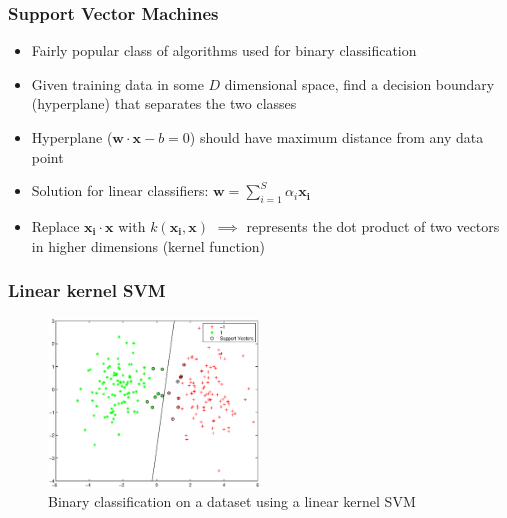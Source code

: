 \documentclass{beamer}
\begin{document}
    \begin{frame}
        \frametitle{Support Vector Machines}
        \begin{itemize}
            \item{Fairly popular class of algorithms used for binary classification}
            \item{Given training data in some $D$ dimensional space, find a decision boundary (hyperplane) that separates the two classes}
            \pause
            \item{Hyperplane ($\mathbf{w} \cdot \mathbf{x} - b = 0$) should have maximum distance from any data point}
            \item{Solution for linear classifiers: $\mathbf{w} = \displaystyle \sum_{i = 1}^{S} \alpha_i\mathbf{x_i}$}
            \pause
            \item{Replace $\mathbf{x_i} \cdot \mathbf{x}$ with $k(\mathbf{x_i}, \mathbf{x})$ $\implies$ represents the dot product of two vectors in higher dimensions (kernel function)}
        \end{itemize}
    \end{frame}
    
    \begin{frame}
        \frametitle{Linear kernel SVM}
        \begin{figure}
            \centering
            \includegraphics[width=0.5\textwidth]{figures/svm_linear_classification.eps}
            \caption{Binary classification on a dataset using a linear kernel SVM}
        \end{figure}
    \end{frame}
    
\end{document}
